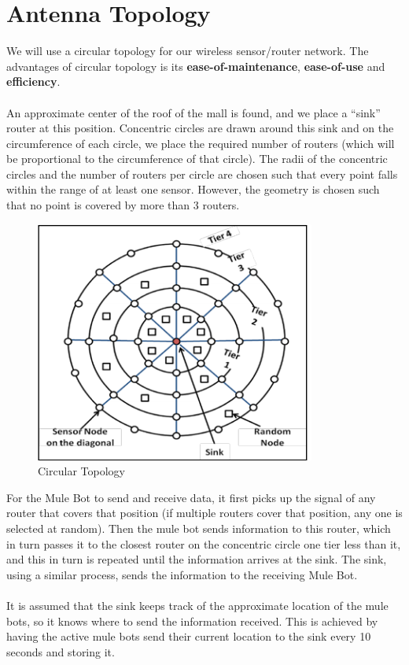 \documentclass{article}
\begin{document}
\section{Antenna Topology}
We will use a circular topology for our wireless sensor/router network.
The advantages of circular topology is its \textbf{ease-of-maintenance}, \textbf{ease-of-use} and \textbf{efficiency}.
\\ \\
An approximate center of the roof of the mall is found, and we place a ``sink'' router at this position. Concentric circles are drawn around
this sink and on the circumference of each circle, we place the required
number of routers (which will be proportional to the circumference of
that circle). The radii of the concentric circles and the number of
routers per circle are chosen such that every point falls within the
range of at least one sensor. However, the geometry is chosen such that
no point is covered by more than 3 routers.

\begin{figure}[htp]
    \centering
    \includegraphics[scale=0.9]{Images/t1.png}
    \caption{Circular Topology \cite{antenna}}
    \label{fig:galaxy}
\end{figure}

\noindent For the Mule Bot to send and receive data, it first picks up the signal of
any router that covers that position (if multiple routers cover that
position, any one is selected at random). Then the mule bot sends
information to this router, which in turn passes it to the closest router
on the concentric circle one tier less than it, and
this in turn is repeated until the information arrives at the sink. The
sink, using a similar process, sends the information to the receiving
Mule Bot.
\\ \\
It is assumed that the sink keeps track of the approximate location of the mule bots, so it knows where to send the information received. This is achieved by having the active mule bots send their current location to the sink every 10 seconds and storing it.
\end{document}
